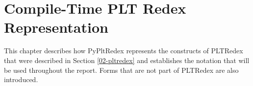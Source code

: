 \chapter{Compile-Time PLT Redex Representation}
\label{chapter05}

This chapter describes how PyPltRedex represents the constructs of PLTRedex that were described in Section \ref{02-pltredex} and establishes the notation that will be used throughout the report. Forms that are not part of PLTRedex are also introduced.





